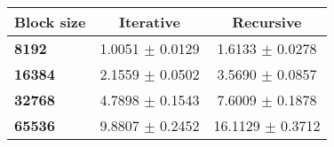 \begin{tabular}{lcc}\toprule
\textbf{Block size}  & \textbf{Iterative} & \textbf{Recursive}\\\midrule
\textbf{8192}  & 1.0051 $\pm$ 0.0129 & 1.6133 $\pm$ 0.0278\\
\textbf{16384}  & 2.1559 $\pm$ 0.0502 & 3.5690 $\pm$ 0.0857\\
\textbf{32768}  & 4.7898 $\pm$ 0.1543 & 7.6009 $\pm$ 0.1878\\
\textbf{65536} & 9.8807 $\pm$ 0.2452 & 16.1129 $\pm$ 0.3712\\
\bottomrule
\end{tabular}

